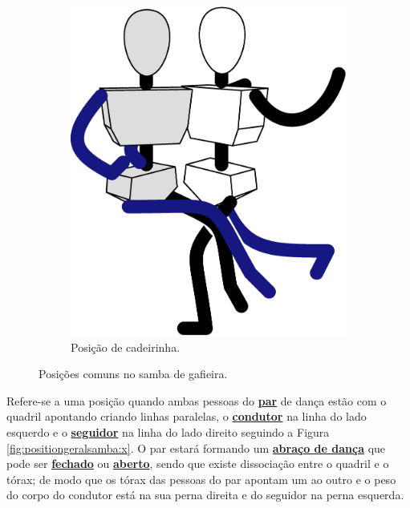 \begin{figure}[!ht]
\begin{subfigure}[b]{0.295\textwidth}
         \includegraphics[width=\textwidth]{chapters/cap-normas/position-cadeirinha.eps}
         \caption{Posição de cadeirinha.}
         \label{fig:positiongeralsamba:cadeirinha}
     \end{subfigure}
\caption{Posições comuns no samba de gafieira.}
\label{fig:positiongeralsamba}
\end{figure}

\begin{definition}[Posição de X:]
\label{def:X-position} 
Refere-se a uma posição quando ambas pessoas do \hyperref[def:Par]{\textbf{par}} 
de dança estão com o quadril apontando criando linhas paralelas,
o \hyperref[def:Condutor]{\textbf{condutor}} na linha do lado esquerdo e
o \hyperref[def:Seguidor]{\textbf{seguidor}} na linha do lado direito seguindo a Figura \ref{fig:positiongeralsamba:x}.
O par estará formando um \hyperref[def:abracodedanca]{\textbf{abraço de dança}}
que pode ser \hyperref[def:closed-position]{\textbf{fechado}} 
ou \hyperref[def:open-position]{\textbf{aberto}},
sendo que existe dissociação entre o quadril e o tórax;
de modo que os tórax das pessoas do par apontam um ao outro e 
o peso do corpo do condutor está na sua perna direita e do seguidor na perna esquerda.
\end{definition}

